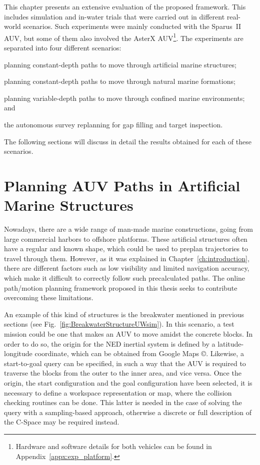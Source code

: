 This chapter presents an extensive evaluation of the proposed framework. This
includes simulation and in-water trials that were carried out in different
real-world scenarios. Such experiments were mainly conducted with the Sparus~II
\ac{AUV}, but some of them also involved the AsterX \ac{AUV}\footnote{Hardware
and software details for both vehicles can be found in
Appendix~\ref{appx:exp_platform}.}. The experiments are separated into four
different scenarios:
\begin{inparaenum}[1)]
\item planning constant-depth paths to move through artificial marine
structures;
\item planning constant-depth paths to move through natural marine
formations;
\item planning variable-depth paths to move through confined marine
environments; and 
\item the autonomous survey replanning for gap filling and target inspection.
\end{inparaenum}
The following sections will discuss in detail the results obtained for each of
these scenarios.

\section{Planning AUV Paths in Artificial Marine Structures}

Nowadays, there are a wide range of man-made marine constructions, going from
large commercial harbors to offshore platforms. These artificial structures
often have a regular and known shape, which could be used to preplan
trajectories to travel through them. However, as it was explained in
Chapter~\ref{ch:introduction}, there are different factors such as low
visibility and limited navigation accuracy, which make it difficult to correctly
follow such precalculated paths. The online path/motion planning framework
proposed in this thesis seeks to contribute overcoming these limitations.

An example of this kind of structures is the breakwater mentioned in previous
sections (see Fig.~\ref{fig:BreakwaterStructureUWsim}). In this scenario, a test
mission could be one that makes an \ac{AUV} to move amidst the concrete blocks.
In order to do so, the origin for the \ac{NED} inertial system is defined by a
latitude-longitude coordinate, which can be obtained from Google Maps
\copyright. Likewise, a start-to-goal query can be specified, in such a way that
the \ac{AUV} is required to traverse the blocks from the outer to the inner
area, and vice versa. Once the origin, the start configuration and the goal
configuration have been selected, it is necessary to define a workspace
representation or map, where the collision checking routines can be done. This
latter is needed in the case of solving the query with a sampling-based
approach, otherwise a discrete or full description of the \ac{C-Space} may be
required instead.


